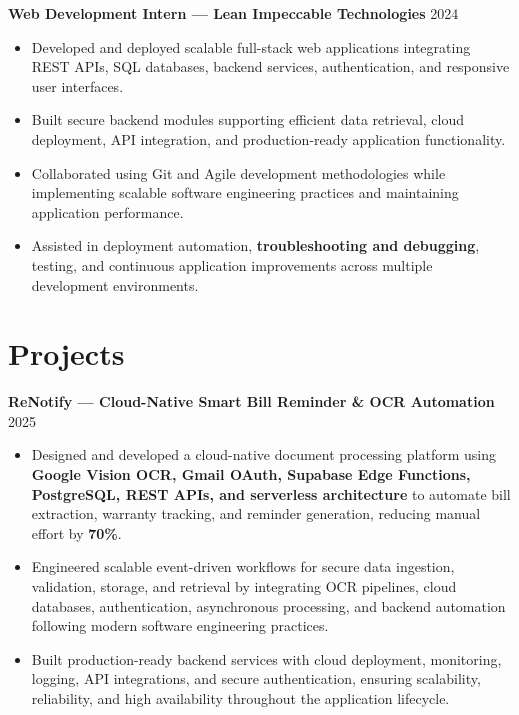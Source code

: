 \documentclass[9pt]{article}
\begin{document}
\textbf{Web Development Intern — Lean Impeccable Technologies} \hfill 2024
\begin{itemize}
    \item Developed and deployed scalable full-stack web applications integrating REST APIs, SQL databases, backend services, authentication, and responsive user interfaces.
    \item Built secure backend modules supporting efficient data retrieval, cloud deployment, API integration, and production-ready application functionality.
    \item Collaborated using Git and Agile development methodologies while implementing scalable software engineering practices and maintaining application performance.
    \item Assisted in deployment automation, \textbf{troubleshooting and debugging}, testing, and continuous application improvements across multiple development environments.
\end{itemize}


\section*{Projects}

\textbf{ReNotify — Cloud-Native Smart Bill Reminder \& OCR Automation} \hfill 2025
\begin{itemize}
    \item Designed and developed a cloud-native document processing platform using \textbf{Google Vision OCR, Gmail OAuth, Supabase Edge Functions, PostgreSQL, REST APIs, and serverless architecture} to automate bill extraction, warranty tracking, and reminder generation, reducing manual effort by \textbf{70\%}.
    
    \item Engineered scalable event-driven workflows for secure data ingestion, validation, storage, and retrieval by integrating OCR pipelines, cloud databases, authentication, asynchronous processing, and backend automation following modern software engineering practices.
    
    \item Built production-ready backend services with cloud deployment, monitoring, logging, API integrations, and secure authentication, ensuring scalability, reliability, and high availability throughout the application lifecycle.
\end{itemize}
\end{document}
